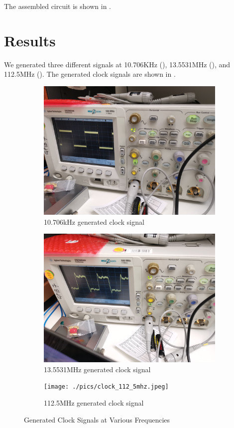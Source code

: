 \documentclass{article}
\begin{document}
The assembled circuit is shown in .

\section{Results}

We generated three different signals at 10.706KHz (), 13.5531MHz (), and 112.5MHz ().
The generated clock signals are shown in .

\begin{figure}[h]
    \centering
    \begin{subfigure}{.33\linewidth}
        \includegraphics[width=.9\linewidth]{./pics/clock_10_70khz.jpg}
        \caption{10.706kHz generated clock signal}
        \label{fig:clock_10_70k}
    \end{subfigure}%
    \begin{subfigure}{.33\linewidth}
        \includegraphics[width=.9\linewidth]{./pics/clock_13_55mhz.jpg}
        \caption{13.5531MHz generated clock signal}
        \label{fig:clock_13_55m}
    \end{subfigure}%
    \begin{subfigure}{.33\linewidth}
        \texttt{[image: ./pics/clock\_112\_5mhz.jpeg]}
        \caption{112.5MHz generated clock signal}
        \label{fig:clock_112_5m}
    \end{subfigure}%
    \caption{Generated Clock Signals at Various Frequencies}
    \label{fig:clock}
\end{figure}
\end{document}
